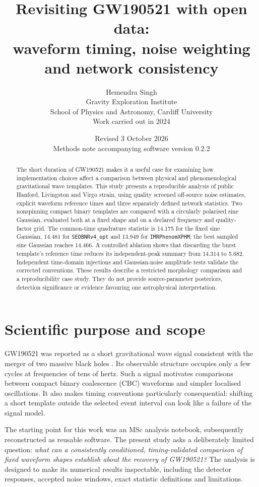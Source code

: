 \documentclass[11pt,a4paper]{article}
\title{\vspace{-1.3cm}Revisiting GW190521 with open data:\\waveform timing, noise weighting\\and network consistency}
\author{Hemendra Singh\\\small Gravity Exploration Institute\\\small School of Physics and Astronomy, Cardiff University\\\small Work carried out in 2024}
\date{Revised 3 October 2026\\\small Methods note accompanying software version 0.2.2}
\begin{document}
\maketitle
\begin{abstract}
The short duration of GW190521 makes it a useful case for examining how implementation choices affect a comparison between physical and phenomenological gravitational wave templates. This study presents a reproducible analysis of public Hanford, Livingston and Virgo strain, using quality screened off-source noise estimates, explicit waveform reference times and three separately defined network statistics. Two nonspinning compact binary templates are compared with a circularly polarised sine Gaussian, evaluated both at a fixed shape and on a declared frequency and quality-factor grid. The common-time quadrature statistic is 14.175 for the fixed sine Gaussian, 14.481 for \texttt{SEOBNRv4\_opt} and 13.949 for \texttt{IMRPhenomXPHM}; the best sampled sine Gaussian reaches 14.466. A controlled ablation shows that discarding the burst template's reference time reduces its independent-peak summary from 14.314 to 5.682. Independent time-domain injections and Gaussian-noise amplitude tests validate the corrected conventions. These results describe a restricted morphology comparison and a reproducibility case study. They do not provide source-parameter posteriors, detection significance or evidence favouring one astrophysical interpretation.
\end{abstract}

\section{Scientific purpose and scope}
GW190521 was reported as a short gravitational wave signal consistent with the merger of two massive black holes \cite{discovery,implications}. Its observable structure occupies only a few cycles at frequencies of tens of hertz. Such a signal motivates comparisons between compact binary coalescence (CBC) waveforms and simpler localised oscillations. It also makes timing conventions particularly consequential: shifting a short template outside the selected event interval can look like a failure of the signal model.

The starting point for this work was an MSc analysis notebook, subsequently reconstructed as reusable software. The present study asks a deliberately limited question: \emph{what can a consistently conditioned, timing-validated comparison of fixed waveform shapes establish about the recovery of GW190521?} The analysis is designed to make its numerical results inspectable, including the detector responses, accepted noise windows, exact statistic definitions and limitations.
\end{document}
